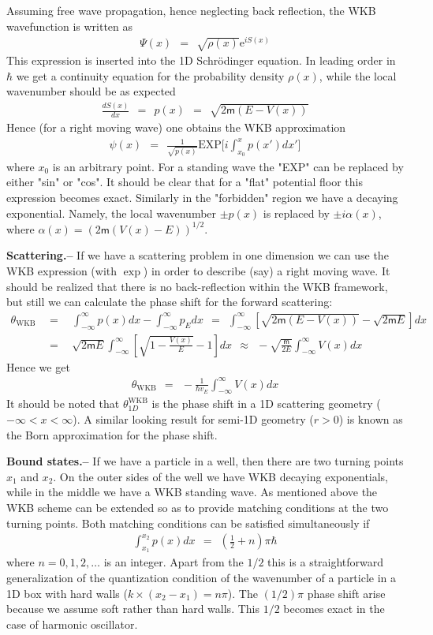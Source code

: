 \documentclass[onecolumn,fleqn, 11pt]{revtex4}
\newcommand{\eexp}{\mathrm{e}^}
\newcommand{\mass}{\mathsf{m}}
\newcommand{\tbox}[1]{\text{#1}}
\newcommand{\beq}{\begin{eqnarray}}
\newcommand{\eeq}{\end{eqnarray}}
\begin{document}
Assuming free wave propagation, hence neglecting 
back reflection, the WKB wavefunction is written as 
\beq 
\Psi(x) \ \  = \ \ \sqrt{\rho(x)} \eexp{iS(x)} 
\eeq
This expression is inserted into the 1D Schr\"{o}dinger 
equation. In leading order in $\hbar$ we get 
a continuity equation for the probability density $\rho(x)$, 
while the local wavenumber should be as expected 
\beq 
\frac{dS(x)}{dx} \ \ = \ \ p(x) \ \ = \ \ \sqrt{2\mass (E-V(x))} 
\eeq
Hence (for a right moving wave) one obtains the WKB approximation
\beq 
\psi(x) \ \ = \ \ \frac{1}{\sqrt{p(x)}}\mbox{EXP}\Big[i\int_{x_0}^{x}p(x')dx'\Big] 
\eeq
where $x_0$ is an arbitrary point. 
For a standing wave the "EXP" can be replaced 
by either "sin" or "cos". 
It should be clear that for a "flat" potential 
floor this expression becomes exact.
Similarly in the "forbidden" region
we have a decaying exponential. Namely,  
the local wavenumber $\pm p(x)$ is replaced 
by ${\pm i\alpha(x)}$, 
where  $\alpha(x) = (2 \mass (V(x)-E))^{1/2}$. 

 

{\bf Scattering.-- } 
If we have a scattering problem in one dimension 
we can use the WKB expression (with $\exp$) in order 
to describe (say) a right moving wave. 
It should be realized that there is no back-reflection 
within the WKB framework, but still we can calculate 
the phase shift for the forward scattering: 
\beq 
\theta_{\tbox{WKB}} & \ \ = \ \ & 
\int_{-\infty}^{\infty}p(x)dx -\int_{-\infty}^{\infty} p_E dx 
\ \ = \ \ 
\int_{-\infty}^{\infty}\left[\sqrt{2\mass(E-V(x))}-\sqrt{2\mass E}\right]dx 
\\ \nonumber
& \ \ = \ \ &
\sqrt{2\mass E}\int_{-\infty}^{\infty} \left[\sqrt{1-\frac{V(x)}{E}}-1\right]dx        
\ \ \approx \ \ 
-\sqrt{\frac{\mass}{2E}}\int_{-\infty}^{\infty}V(x)dx  
\eeq
Hence we get 
\beq 
\theta_{\tbox{WKB}} \ \ = \ \ -\frac{1}{\hbar v_E}\int_{-\infty}^{\infty}V(x)dx 
\eeq
It should be noted that $\theta^{\tbox{WKB}}_{1D}$ 
is the phase shift in a 1D scattering geometry ($-\infty<x<\infty$). 
A similar looking result for semi-1D geometry ($r>0$) 
is known as the Born approximation for the phase shift.



{\bf Bound states.-- } 
If we have a particle in a well, 
then there are two turning points $x_1$ and $x_2$. 
On the outer sides of the well we have WKB decaying 
exponentials, while in the middle we have 
a WKB standing wave. 
As mentioned above the WKB scheme can be extended 
so as to provide matching conditions at the 
two turning points. Both matching conditions 
can be satisfied simultaneously if 
\beq
\int_{x_1}^{x_2} p(x)dx \ \ = \ \  \left(\frac{1}{2}+n\right)\pi\hbar
\eeq
where $n=0,1,2, \dots $ is an integer.
Apart from the $1/2$ this is a straightforward 
generalization of the quantization condition
of the wavenumber of a particle in a 1D box with hard walls 
(${k\times(x_2-x_1)=n\pi}$). 
The $(1/2)\pi$ phase shift arise because 
we assume soft rather than hard walls. 
This $1/2$ becomes exact in the case 
of harmonic oscillator. 
\end{document}
